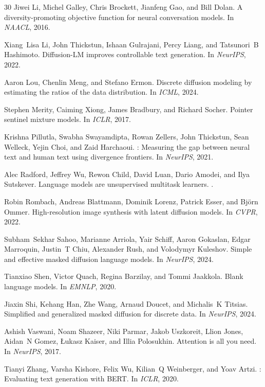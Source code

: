 \documentclass{article}
\begin{document}
\begin{thebibliography}{30}
Jiwei Li, Michel Galley, Chris Brockett, Jianfeng Gao, and Bill Dolan.
\newblock A diversity-promoting objective function for neural conversation models.
\newblock In \emph{NAACL}, 2016.

Xiang~Lisa Li, John Thickstun, Ishaan Gulrajani, Percy Liang, and Tatsunori~B Hashimoto.
\newblock Diffusion-{LM} improves controllable text generation.
\newblock In \emph{NeurIPS}, 2022.

Aaron Lou, Chenlin Meng, and Stefano Ermon.
\newblock Discrete diffusion modeling by estimating the ratios of the data distribution.
\newblock In \emph{ICML}, 2024.

Stephen Merity, Caiming Xiong, James Bradbury, and Richard Socher.
\newblock Pointer sentinel mixture models.
\newblock In \emph{ICLR}, 2017.

Krishna Pillutla, Swabha Swayamdipta, Rowan Zellers, John Thickstun, Sean Welleck, Yejin Choi, and Zaid Harchaoui.
: Measuring the gap between neural text and human text using divergence frontiers.
\newblock In \emph{NeurIPS}, 2021.

Alec Radford, Jeffrey Wu, Rewon Child, David Luan, Dario Amodei, and Ilya Sutskever.
\newblock Language models are unsupervised multitask learners.
.

Robin Rombach, Andreas Blattmann, Dominik Lorenz, Patrick Esser, and Bj{\"o}rn Ommer.
\newblock High-resolution image synthesis with latent diffusion models.
\newblock In \emph{CVPR}, 2022.

Subham~Sekhar Sahoo, Marianne Arriola, Yair Schiff, Aaron Gokaslan, Edgar Marroquin, Justin~T Chiu, Alexander Rush, and Volodymyr Kuleshov.
\newblock Simple and effective masked diffusion language models.
\newblock In \emph{NeurIPS}, 2024.

Tianxiao Shen, Victor Quach, Regina Barzilay, and Tommi Jaakkola.
\newblock Blank language models.
\newblock In \emph{EMNLP}, 2020.

Jiaxin Shi, Kehang Han, Zhe Wang, Arnaud Doucet, and Michalis~K Titsias.
\newblock Simplified and generalized masked diffusion for discrete data.
\newblock In \emph{NeurIPS}, 2024.

Ashish Vaswani, Noam Shazeer, Niki Parmar, Jakob Uszkoreit, Llion Jones, Aidan~N Gomez, {\L}ukasz Kaiser, and Illia Polosukhin.
\newblock Attention is all you need.
\newblock In \emph{NeurIPS}, 2017.

Tianyi Zhang, Varsha Kishore, Felix Wu, Kilian~Q Weinberger, and Yoav Artzi.
: Evaluating text generation with {BERT}.
\newblock In \emph{ICLR}, 2020.

\end{thebibliography}
\end{document}
